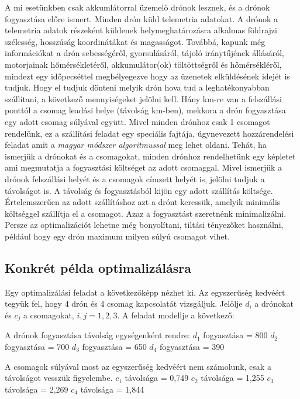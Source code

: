 A mi esetünkben csak akkumlátorral üzemelő drónok lesznek, és a drónok fogyasztása előre ismert.
Minden drón küld telemetria adatokat.
A drónok a telemetria adatok részeként küldenek helymeghatározásra alkalmas földrajzi szélesség, hosszúság koordinátákat és magasságot.
Továbbá, kapunk még információkat a drón sebességéről, gyorsulásáról, tájoló iránytűjének állásáról, motorjainak hőmérsékletéről, akkumulátor(ok) töltöttségről és hőmérsékléről, mindezt egy időpecséttel megbélyegezve hogy az üzenetek elküldésének idejét is tudjuk.
Hogy el tudjuk dönteni melyik drón hova tud a leghatékonyabban szállítani, a következő mennyiségeket jelölni kell. Hány km-re van a felszállási ponttól a csomag leadási helye (távolság km-ben), mekkora a drón fogyasztása egy adott csomag súlyával együtt.
Mivel minden drónhoz csak 1 csomagot rendelünk, ez a szállítási feladat egy speciális fajtája, úgynevezett hozzárendelési feladat amit a \textit{magyar módszer algoritmussal}\cite{magyar-modszer} meg lehet oldani.
Tehát, ha ismerjük a drónokat és a csomagokat, minden drónhoz rendelhetünk egy képletet ami megmutatja a fogyasztási költséget az adott csomaggal.
Mivel ismerjük a drónok felszállási helyét és a csomagok címzett helyét is, jelölni tudjuk a távolságot is.
A távolság és fogyasztásból kijön egy adott szállítás költsége.
Értelemszerűen az adott szállításhoz azt a drónt keressük, amelyik minimális költséggel szállítja el a csomagot.
Azaz a fogyasztást szeretnénk minimalizálni.
Persze az optimalizációt lehetne még bonyolítani, tiltási tényezőket használni, például hogy egy drón maximum milyen súlyú csomagot vihet.

\subsection{Konkrét példa optimalizálásra}
Egy optimalizálási feladat a következőképp nézhet ki. Az egyszerűség kedvéért tegyük fel, hogy 4 drón és 4 csomag kapcsolatát vizsgáljuk. Jelölje $d_{i}$ a drónokat és $c_{j}$ a csomagokat, $i, j = 1, 2, 3.$
A feladat modellje a következő:

A drónok fogyasztása távolság egységenként rendre:
$d_{1}$ fogyasztása = 800
$d_{2}$ fogyasztása = 700
$d_{3}$ fogyasztása = 650
$d_{4}$ fogyasztása = 390

A csomagok súlyával most az egyszerűség kedvéért nem számolunk, csak a távolságot vesszük figyelembe.
$c_{1}$ távolsága = 0,749
$c_{2}$ távolsága = 1,255
$c_{3}$ távolsága = 2,269
$c_{4}$ távolsága = 1,844 \\

